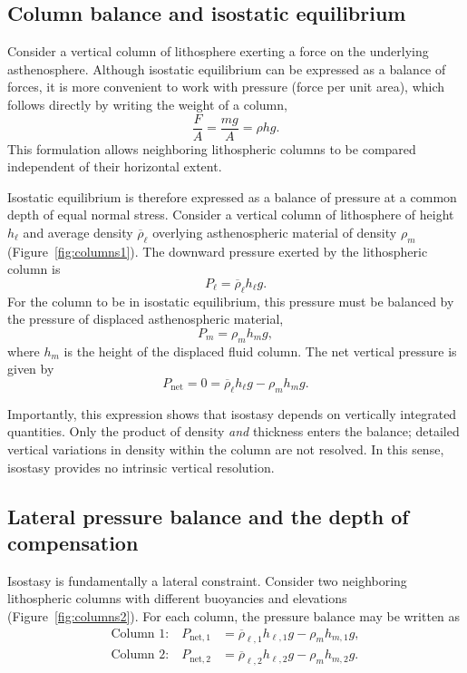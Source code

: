 \subsection{Column balance and isostatic equilibrium}

Consider a vertical column of lithosphere exerting a force on the underlying asthenosphere.
Although isostatic equilibrium can be expressed as a balance of forces, it is more convenient to work with pressure (force per unit area), which follows directly by writing the weight of a column,
\begin{equation}
    \frac{F}{A} = \frac{m g}{A} = \rho h g .
\end{equation}
This formulation allows neighboring lithospheric columns to be compared independent of their horizontal extent.


Isostatic equilibrium is therefore expressed as a balance of pressure at a common depth of equal normal stress.  Consider a vertical column of lithosphere of height $h_{\ell}$ and average density $\overline{\rho}_{\ell}$ overlying asthenospheric material of density $\rho_m$ (Figure~\ref{fig:columns1}).  The downward pressure exerted by the lithospheric column is
\[
    P_{\ell} = \overline{\rho}_{\ell} h_{\ell} g .
\]
For the column to be in isostatic equilibrium, this pressure must be balanced by the pressure of displaced asthenospheric material,
\[
    P_m = \rho_m h_m g ,
\]
where $h_m$ is the height of the displaced fluid column.  The net vertical pressure is given by
\[
    P_{\mathrm{net}} = 0 = \overline{\rho}_{\ell} h_{\ell} g - \rho_m h_m g .
\]

Importantly, this expression shows that isostasy depends on vertically integrated quantities.  Only the product of density \emph{and} thickness enters the balance; detailed vertical variations in density within the column are not resolved.  In this sense, isostasy provides no intrinsic vertical resolution.

\subsection{Lateral pressure balance and the depth of compensation}

Isostasy is fundamentally a lateral constraint.  Consider two neighboring lithospheric columns with different buoyancies and elevations (Figure~\ref{fig:columns2}).  For each column, the pressure balance may be written as
\begin{align*}
    \text{Column 1:} \quad 
    P_{\mathrm{net},1} &= \overline{\rho}_{\ell,1} h_{\ell,1} g - \rho_m h_{m,1} g , \\
    \text{Column 2:} \quad
    P_{\mathrm{net},2} &= \overline{\rho}_{\ell,2} h_{\ell,2} g - \rho_m h_{m,2} g .
\end{align*}


